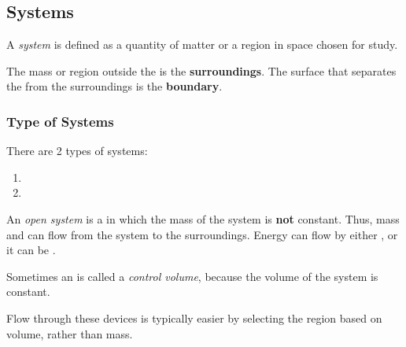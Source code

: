 \subsection{Systems}\label{subsec:Systems}
\begin{definition}[System]\label{def:System}
  A \emph{system} is defined as a quantity of matter or a region in space chosen for study.
\end{definition}

The mass or region outside the  is the \textbf{surroundings}.
The surface that separates the  from the surroundings is the \textbf{boundary}.

\subsubsection{Type of Systems}\label{subsubsec:Types_Systems}
There are 2 types of systems:
\begin{enumerate}[noitemsep]
\item {}
\item {}
\end{enumerate}

\begin{definition}\label{def:Open_System}
  An \emph{open system} is a  in which the mass of the system is \textbf{not} constant.
  Thus, mass and  can flow from the system to the surroundings.
  Energy can flow by either , or it can be .

  \begin{remark}\label{rmk:Control_Volume}
    Sometimes an  is called a \emph{control volume}, because the volume of the system is constant.
  \end{remark}

  \begin{remark}
    Flow through these devices is typically easier by selecting the region based on volume, rather than mass.
  \end{remark}
\end{definition}

